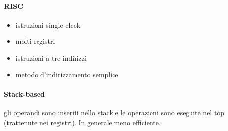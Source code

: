 \paragraph{RISC}
\begin{itemize}
\item istruzioni single-clcok
\item molti registri
\item istruzioni a tre indirizzi
\item metodo d'indirizzamento semplice
\end{itemize}
\paragraph{Stack-based}
gli operandi sono inseriti nello stack e le operazioni sono eseguite nel top
(trattenute nei registri). In generale meno efficiente.
